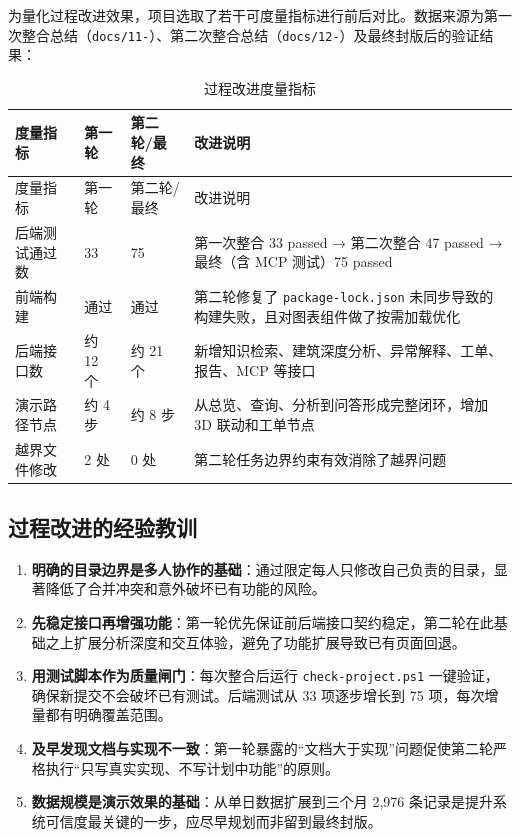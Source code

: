 \documentclass[12pt,a4paper]{ctexart}
\newcommand{\code}[1]{{\footnotesize\nolinkurl{#1}}}
\begin{document}
为量化过程改进效果，项目选取了若干可度量指标进行前后对比。数据来源为第一次整合总结（\code{docs/11-}）、第二次整合总结（\code{docs/12-}）及最终封版后的验证结果：

\begin{longtable}{L{3.4cm}L{2.2cm}L{2.2cm}L{6.2cm}}
\caption{过程改进度量指标}\\
\toprule
度量指标 & 第一轮 & 第二轮/最终 & 改进说明 \\
\midrule
\endfirsthead
\toprule
度量指标 & 第一轮 & 第二轮/最终 & 改进说明 \\
\midrule
\endhead
后端测试通过数 & 33 & 75 & 第一次整合 33 passed → 第二次整合 47 passed → 最终（含 MCP 测试）75 passed \\
前端构建 & 通过 & 通过 & 第二轮修复了 \code{package-lock.json} 未同步导致的构建失败，且对图表组件做了按需加载优化 \\
后端接口数 & 约 12 个 & 约 21 个 & 新增知识检索、建筑深度分析、异常解释、工单、报告、MCP 等接口 \\
演示路径节点 & 约 4 步 & 约 8 步 & 从总览、查询、分析到问答形成完整闭环，增加 3D 联动和工单节点 \\
越界文件修改 & 2 处 & 0 处 & 第二轮任务边界约束有效消除了越界问题 \\
\bottomrule
\end{longtable}

\subsection{过程改进的经验教训}

\begin{enumerate}
    \item \textbf{明确的目录边界是多人协作的基础}：通过限定每人只修改自己负责的目录，显著降低了合并冲突和意外破坏已有功能的风险。
    \item \textbf{先稳定接口再增强功能}：第一轮优先保证前后端接口契约稳定，第二轮在此基础之上扩展分析深度和交互体验，避免了功能扩展导致已有页面回退。
    \item \textbf{用测试脚本作为质量闸门}：每次整合后运行 \code{check-project.ps1} 一键验证，确保新提交不会破坏已有测试。后端测试从 33 项逐步增长到 75 项，每次增量都有明确覆盖范围。
    \item \textbf{及早发现文档与实现不一致}：第一轮暴露的“文档大于实现”问题促使第二轮严格执行“只写真实实现、不写计划中功能”的原则。
    \item \textbf{数据规模是演示效果的基础}：从单日数据扩展到三个月 2,976 条记录是提升系统可信度最关键的一步，应尽早规划而非留到最终封版。
\end{enumerate}
\end{document}
